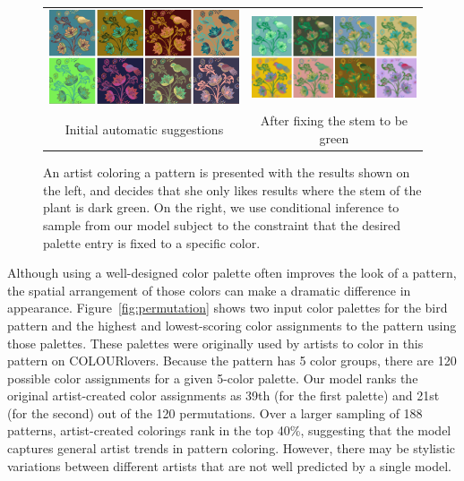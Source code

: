 \begin{figure}[ht]
\begin{tabular}{cc} 
\includegraphics[width=.475\linewidth]{figs/constrainedSearchUnconstrained}&\includegraphics[width=.475\linewidth]{figs/constrainedSearchConstrained}\\
Initial automatic suggestions & After fixing the stem to be green\\
\end{tabular}

\caption{An artist coloring a pattern is presented with the results shown on the left, and decides that she only likes results where the stem of the plant is dark green. On the right, we use conditional inference to sample from our model subject to the constraint that the desired palette entry is fixed to a specific color.}
\label{fig:constrainedInference}
\vspace{-1.0em}
\end{figure}

Although using a well-designed color palette often improves the look of a pattern, the spatial arrangement of those colors can make a dramatic difference in appearance. Figure~\ref{fig:permutation} shows two input color palettes for the bird pattern and the highest and lowest-scoring color assignments to the pattern using those palettes. These palettes were originally used by artists to color in this pattern on COLOURlovers. Because the pattern has 5 color groups, there are 120 possible color assignments for a given 5-color palette. Our model ranks the original artist-created color assignments as 39th (for the first palette) and 21st (for the second) out of the 120 permutations. Over a larger sampling of 188 patterns, artist-created colorings rank in the top 40\%, suggesting that the model captures general artist trends in pattern coloring. However, there may be stylistic variations between different artists that are not well predicted by a single model.


